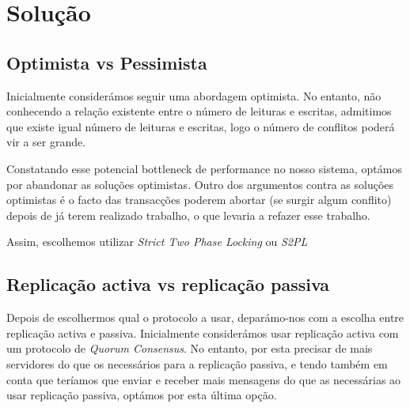 \section{Solução}

\subsection{Optimista vs Pessimista}

Inicialmente considerámos seguir uma abordagem optimista. No entanto, não conhecendo a relação existente entre o número de leituras e escritas, admitimos que existe igual número de leituras e escritas, logo o número de conflitos poderá vir a ser grande. 

Constatando esse potencial bottleneck de performance no nosso sistema, optámos por abandonar as soluções optimistas. Outro dos argumentos contra as soluções optimistas é o facto das transacções poderem abortar (se surgir algum conflito) depois de já terem realizado trabalho, o que levaria a refazer esse trabalho.

Assim, escolhemos utilizar \textit{Strict Two Phase Locking} ou \textit{S2PL}

\subsection{Replicação activa vs replicação passiva}

Depois de escolhermos qual o protocolo a usar, deparámo-nos com a escolha entre replicação activa e passiva. Inicialmente considerámos usar replicação activa com um protocolo de \textit{Quorum Consensus}. No entanto, por esta precisar de mais servidores do que os necessários para a replicação passiva, e tendo também em conta que teríamos que enviar e receber mais mensagens do que as necessárias ao usar replicação passiva, optámos por esta última opção.
